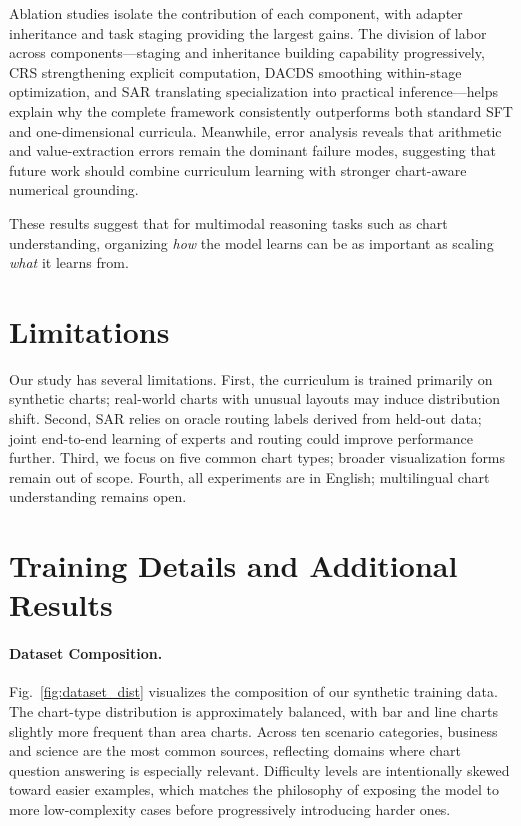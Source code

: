 \documentclass[journal]{IEEEtran}
\newcommand{\crs}{CRS}
\newcommand{\dacds}{DACDS}
\newcommand{\sar}{SAR}
\begin{document}
Ablation studies isolate the contribution of each component, with adapter inheritance and task staging providing the largest gains.
The division of labor across components---staging and inheritance building capability progressively, \crs{} strengthening explicit computation, \dacds{} smoothing within-stage optimization, and \sar{} translating specialization into practical inference---helps explain why the complete framework consistently outperforms both standard SFT and one-dimensional curricula.
Meanwhile, error analysis reveals that arithmetic and value-extraction errors remain the dominant failure modes, suggesting that future work should combine curriculum learning with stronger chart-aware numerical grounding.

These results suggest that for multimodal reasoning tasks such as chart understanding, organizing \emph{how} the model learns can be as important as scaling \emph{what} it learns from.

\section*{Limitations}
Our study has several limitations. First, the curriculum is trained primarily on synthetic charts; real-world charts with unusual layouts may induce distribution shift. Second, \sar{} relies on oracle routing labels derived from held-out data; joint end-to-end learning of experts and routing could improve performance further. Third, we focus on five common chart types; broader visualization forms remain out of scope. Fourth, all experiments are in English; multilingual chart understanding remains open.

\appendices
\section{Training Details and Additional Results}
\paragraph{Dataset Composition.}
Fig.~\ref{fig:dataset_dist} visualizes the composition of our synthetic training data.
The chart-type distribution is approximately balanced, with bar and line charts slightly more frequent than area charts.
Across ten scenario categories, business and science are the most common sources, reflecting domains where chart question answering is especially relevant.
Difficulty levels are intentionally skewed toward easier examples, which matches the philosophy of exposing the model to more low-complexity cases before progressively introducing harder ones.
\end{document}
